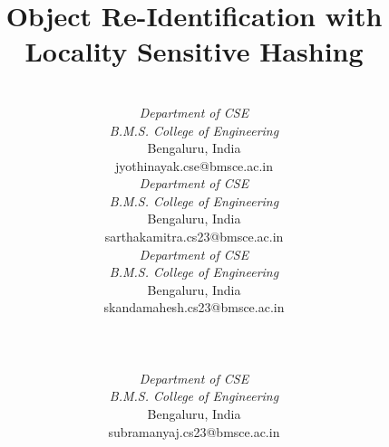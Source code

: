\documentclass[conference]{IEEEtran}
\begin{document}
\title{Object Re-Identification with Locality Sensitive Hashing\\
}


\author{
\begin{tabular}{ccc}
\begin{minipage}[t]{0.30\textwidth}\centering
{\large Dr. Jyothi S. Nayak}\\
\textit{Department of CSE}\\
\textit{B.M.S. College of Engineering}\\
Bengaluru, India\\
jyothinayak.cse@bmsce.ac.in
\end{minipage}
&
\begin{minipage}[t]{0.30\textwidth}\centering
{\large Sarthaka Mitra G.B}\\
\textit{Department of CSE}\\
\textit{B.M.S. College of Engineering}\\
Bengaluru, India\\
sarthakamitra.cs23@bmsce.ac.in 
\end{minipage}
&
\begin{minipage}[t]{0.30\textwidth}\centering
{\large Skanda Mahesh}\\
\textit{Department of CSE}\\
\textit{B.M.S. College of Engineering}\\
Bengaluru, India\\
skandamahesh.cs23@bmsce.ac.in
\end{minipage}
\end{tabular}

\\[2em]

\hspace{0.0\textwidth}
\begin{tabular}{cc}
\begin{minipage}[t]{0.30\textwidth}\centering
{\large Subramanya J}\\
\textit{Department of CSE}\\
\textit{B.M.S. College of Engineering}\\
Bengaluru, India\\
subramanyaj.cs23@bmsce.ac.in
\end{minipage}
\end{tabular}
}

\setlength{\emergencystretch}{1em}
\maketitle
\end{document}
